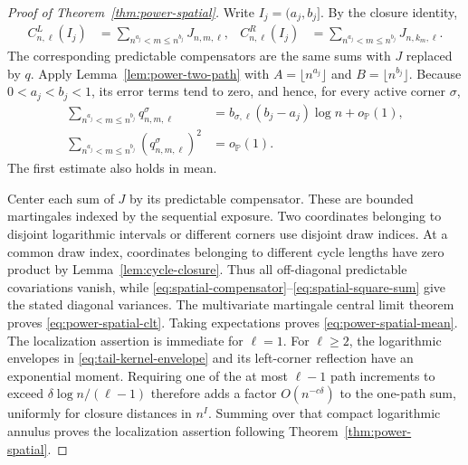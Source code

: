 \documentclass[11pt]{article}
\theoremstyle{remark}
\theoremstyle{plain}
\newcommand{\Pp}{\mathbb P}
\begin{document}
\begin{proof}[Proof of Theorem~\ref{thm:power-spatial}]
Write $I_j=(a_j,b_j]$.  By the closure identity,
\begin{align*}
 C_{n,\ell}^{L}(I_j)
 &=\sum_{n^{a_j}<m\le n^{b_j}}J_{n,m,\ell},&
 C_{n,\ell}^{R}(I_j)
 &=\sum_{n^{a_j}<m\le n^{b_j}}J_{n,k_m,\ell}.
\end{align*}
The corresponding predictable compensators are the same sums with $J$
replaced by $q$.  Apply Lemma~\ref{lem:power-two-path} with
$A=\lfloor n^{a_j}\rfloor$ and $B=\lfloor n^{b_j}\rfloor$.  Because
$0<a_j<b_j<1$, its error terms tend to zero, and hence, for every active
corner $\sigma$,
\begin{align}
 \sum_{n^{a_j}<m\le n^{b_j}}q^\sigma_{n,m,\ell}
 &=b_{\sigma,\ell}(b_j-a_j)\log n+o_{\Pp}(1),
 \label{eq:spatial-compensator}\\
 \sum_{n^{a_j}<m\le n^{b_j}}
 (q^\sigma_{n,m,\ell})^2&=o_{\Pp}(1).
 \label{eq:spatial-square-sum}
\end{align}
The first estimate also holds in mean.

Center each sum of $J$ by its predictable compensator.  These are bounded
martingales indexed by the sequential exposure.  Two coordinates belonging
to disjoint logarithmic intervals or different corners use disjoint draw
indices.  At a common draw index, coordinates belonging to different cycle
lengths have zero product by Lemma~\ref{lem:cycle-closure}.  Thus all
off-diagonal predictable covariations vanish, while
\eqref{eq:spatial-compensator}--\eqref{eq:spatial-square-sum} give the stated
diagonal variances.  The multivariate martingale central limit theorem proves
\eqref{eq:power-spatial-clt}.  Taking expectations proves
\eqref{eq:power-spatial-mean}.  The localization assertion is immediate for
$\ell=1$.  For
$\ell\ge2$, the logarithmic envelopes in
\eqref{eq:tail-kernel-envelope} and its left-corner reflection have an
exponential moment.  Requiring one of the at most $\ell-1$ path increments
to exceed $\delta\log n/(\ell-1)$ therefore adds a factor $O(n^{-c\delta})$
to the one-path sum, uniformly for closure distances in $n^I$.
Summing over that compact logarithmic annulus proves
the localization assertion following Theorem~\ref{thm:power-spatial}.
\end{proof}
\end{document}
